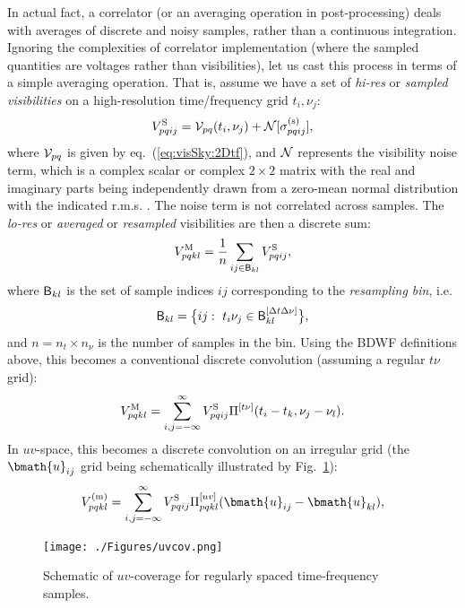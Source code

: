 \documentclass[useAMS,usenatbib]{mn2e}
\begin{document}
In actual fact, a correlator (or an averaging operation in post-processing) deals with averages of discrete and noisy
samples, rather than a continuous integration. Ignoring the complexities of correlator implementation (where the sampled
quantities are voltages rather than visibilities), let us cast this process in terms of a simple averaging operation.
That is, assume we have a set of \emph{hi-res} or \emph{sampled visibilities} on a high-resolution time/frequency grid
$t_i,\nu_j$:
\begin{equation}
\label{eq:sampling}
V^\mathrm{S}_{pqij} = \mathcal{V}_{pq}(t_i,\nu_j) + \mathcal{N}[\sigma^\mathrm{(s)}_{pqij}],
\end{equation}
where $\mathcal{V}_{pq}$ is given by eq.~(\ref{eq:visSky:2Dtf}), and $\mathcal{N}$ represents the visibility noise term, which is
a complex scalar or complex $2\times2$ matrix with the real and imaginary parts being independently drawn from a 
zero-mean normal distribution with the indicated r.m.s. \citep{wrobel1999sensitivity}. The noise
term is not correlated across samples.
The \emph{lo-res} or \emph{averaged} or \emph{resampled} visibilities are then a discrete sum:
\begin{equation}
\label{eq:discrete:tf0}
V^\mathrm{M}_{pqkl} = \frac{1}{n} \sum_{ij\in\mathsf{B}_{kl}}  V^\mathrm{S}_{pqij},
\end{equation}
where $\mathsf{B}_{kl}$ is the set of sample indices $ij$ corresponding to the \emph{resampling bin}, i.e.
\begin{equation}
\mathsf{B}_{kl} = \big \{ ij:~t_i\nu_j \in \mathsf{B}^{[\Delta t\Delta\nu]}_{kl} \big \},
\end{equation}
and $n = n_t\times n_\nu$ is the number of samples in the bin. 
Using the BDWF definitions above, this becomes a conventional discrete convolution (assuming a regular 
$t\nu$ grid):
\begin{equation}
\label{eq:discrete:tf}
V^\mathrm{M}_{pqkl} = \sum_{i,j=-\infty}^{\infty}  V^\mathrm{S}_{pqij} \Pi^{[t\nu]}(t_i-t_k,\nu_j-\nu_l).
\end{equation}
In $uv$-space, this becomes a discrete convolution on an irregular grid (the $\bmath{u}_{ij}$ grid being schematically illustrated by Fig.~\ref{fig:uvcov}):
\begin{equation}
\label{eq:discrete:uv}
V^\mathrm{(m)}_{pqkl} = \sum_{i,j=-\infty}^{\infty}  \Vs_{pqij} \Puv_{pqkl}(\bmath{u}_{ij}-\bmath{u}_{kl}),
\end{equation}

\begin{figure}
\texttt{[image: ./Figures/uvcov.png]}\caption{Schematic of $uv$-coverage for 
regularly spaced time-frequency samples.}\label{fig:uvcov}
\end{figure}
\end{document}
